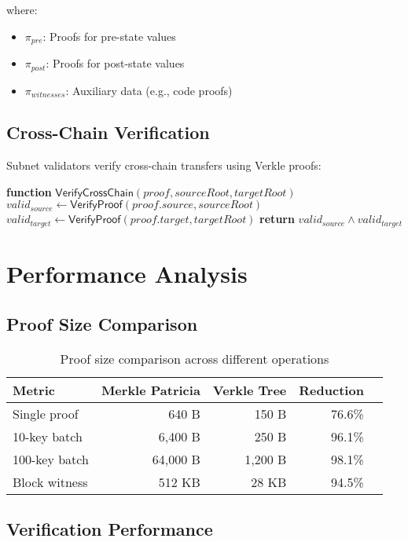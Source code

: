 \documentclass[11pt,a4paper]{article}
\theoremstyle{definition}
\begin{document}
where:
\begin{itemize}
    \item $\pi_{pre}$: Proofs for pre-state values
    \item $\pi_{post}$: Proofs for post-state values
    \item $\pi_{witnesses}$: Auxiliary data (e.g., code proofs)
\end{itemize}

\subsection{Cross-Chain Verification}

Subnet validators verify cross-chain transfers using Verkle proofs:

\begin{algorithmic}[1]
\STATE \textbf{function} $\mathsf{VerifyCrossChain}(proof, sourceRoot, targetRoot)$
\STATE $valid_{source} \gets \mathsf{VerifyProof}(proof.source, sourceRoot)$
\STATE $valid_{target} \gets \mathsf{VerifyProof}(proof.target, targetRoot)$
\STATE \textbf{return} $valid_{source} \land valid_{target}$
\end{algorithmic}

\section{Performance Analysis}

\subsection{Proof Size Comparison}

\begin{table}[H]
\centering
\begin{tabular}{@{}lrrrr@{}}
\toprule
\textbf{Metric} & \textbf{Merkle Patricia} & \textbf{Verkle Tree} & \textbf{Reduction} \\
\midrule
Single proof & 640 B & 150 B & 76.6\% \\
10-key batch & 6,400 B & 250 B & 96.1\% \\
100-key batch & 64,000 B & 1,200 B & 98.1\% \\
Block witness & 512 KB & 28 KB & 94.5\% \\
\bottomrule
\end{tabular}
\caption{Proof size comparison across different operations}
\label{tab:proof-sizes}
\end{table}

\subsection{Verification Performance}
\end{document}
